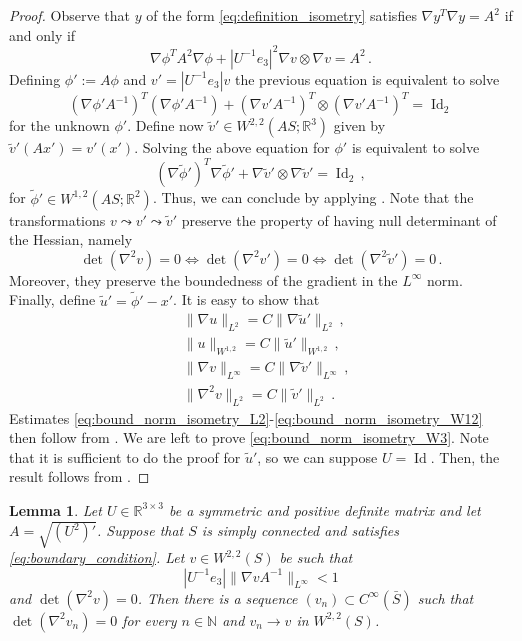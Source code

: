 \documentclass{article}
\theoremstyle{plain}
\theoremstyle{plain}
\theoremstyle{plain}
\newtheorem{lemma}[teo]{Lemma}
\theoremstyle{plain}
\theoremstyle{plain}
\theoremstyle{definition}
\theoremstyle{definition}
\renewcommand{\r}{\mathbb{R}}
\newcommand{\n}{\mathbb{N}}
\DeclareMathOperator{\Id}{Id}
\begin{document}
\begin{proof}
    Observe that $y$ of the form \eqref{eq:definition_isometry} satisfies $\nabla y^T \nabla y = A^2$ if and only if
    \[
        \nabla \phi^T A^2 \nabla \phi + |U^{-1}e_3|^2 \nabla v \otimes \nabla v = A^2 \,.
    \]
    Defining $\phi' := A \phi$ and $v' = |U^{-1}e_3| v$ the previous equation is equivalent to solve
    \[
        (\nabla \phi' A^{-1})^T (\nabla \phi' A^{-1}) +  (\nabla v' A^{-1})^T \otimes (\nabla v' A^{-1})^T = \Id_2
    \]
    for the unknown $\phi'$. Define now $\tilde v' \in W^{2,2}(AS; \r^3)$ given by $\tilde v'(Ax') = v'(x')$. Solving the above equation for $\phi'$ is equivalent to solve
    \[
        (\nabla \tilde \phi')^T \nabla \tilde \phi' +  \nabla \tilde v' \otimes \nabla \tilde v' = \Id_2 \,,
    \]
    for $\tilde \phi' \in W^{1,2}(AS; \r^2)$. Thus, we can conclude by applying \cite[Theorem 7]{FRIESECKE2006}. Note that the transformations $v \leadsto v' \leadsto \tilde v'$ preserve the property of having null determinant of the Hessian, namely
    \[
        \det( \nabla^2 v) = 0 \iff \det( \nabla^2 v') = 0 \iff \det( \nabla^2 \tilde v') = 0 \,.
    \]
    Moreover, they preserve the boundedness of the gradient in the $L^\infty$ norm. Finally, define $\tilde u' = \tilde \phi' - x'$. It is easy to show that 
    \begin{align}
        & \|\nabla u\|_{L^2} = C\|\nabla \tilde u'\|_{L^2} \,,\\
        & \|u\|_{W^{1,2}} = C\|\tilde u'\|_{W^{1,2}} \,,\\
        & \|\nabla v\|_{L^\infty} = C\|\nabla \tilde v'\|_{L^\infty} \,,\\
        & \|\nabla^2 v\|_{L^2} = C\|\tilde v'\|_{L^2} \,.
    \end{align}
Estimates \eqref{eq:bound_norm_isometry_L2}-\eqref{eq:bound_norm_isometry_W12} then follow from \cite[Equations (180)--(181)]{FRIESECKE2006}. We are left to prove \eqref{eq:bound_norm_isometry_W3}. Note that it is sufficient to do the proof for $\tilde u'$, so we can suppose $U = \Id$. Then, the result follows from \cite[Lemma 4.3]{TOLOTTI2024}.
\end{proof}

\begin{lemma}\label{lemma:density_isometries}
    Let $U \in \r^{3 \times 3}$ be a symmetric and positive definite matrix and let $A = \sqrt{(U^2)'}$. Suppose that $S$ is simply connected and satisfies \eqref{eq:boundary_condition}. Let $v \in W^{2,2}(S)$ be such that 
    \[
        |U^{-1}e_3|\|\nabla v A^{-1}\|_{L^\infty} < 1
    \]
    and $\det(\nabla^2 v) = 0$. Then there is a sequence $(v_n) \subset C^\infty(\bar S)$ such that $\det(\nabla^2 v_n) = 0$ for every $n \in \n$ and $v_n \to v$ in $W^{2,2}(S)$.
\end{lemma}
\end{document}
